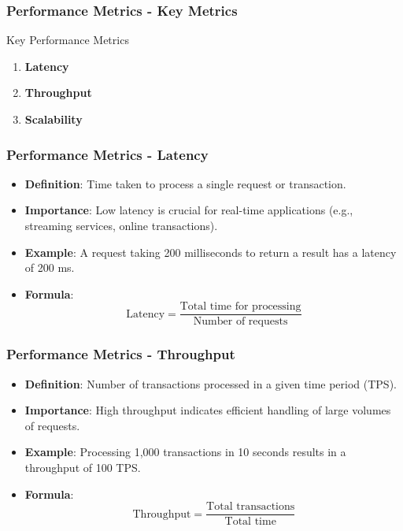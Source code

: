 \documentclass[aspectratio=169]{beamer}
\begin{document}
\begin{frame}[fragile]
    \frametitle{Performance Metrics - Key Metrics}
    \begin{block}{Key Performance Metrics}
        \begin{enumerate}
            \item \textbf{Latency}
            \item \textbf{Throughput}
            \item \textbf{Scalability}
        \end{enumerate}
    \end{block}
\end{frame}

\begin{frame}[fragile]
    \frametitle{Performance Metrics - Latency}
    \begin{itemize}
        \item \textbf{Definition}: Time taken to process a single request or transaction.
        \item \textbf{Importance}: Low latency is crucial for real-time applications (e.g., streaming services, online transactions).
        \item \textbf{Example}: A request taking 200 milliseconds to return a result has a latency of 200 ms.
        \item \textbf{Formula}:
        \begin{equation}
            \text{Latency} = \frac{\text{Total time for processing}}{\text{Number of requests}}
        \end{equation}
    \end{itemize}
\end{frame}

\begin{frame}[fragile]
    \frametitle{Performance Metrics - Throughput}
    \begin{itemize}
        \item \textbf{Definition}: Number of transactions processed in a given time period (TPS).
        \item \textbf{Importance}: High throughput indicates efficient handling of large volumes of requests.
        \item \textbf{Example}: Processing 1,000 transactions in 10 seconds results in a throughput of 100 TPS.
        \item \textbf{Formula}:
        \begin{equation}
            \text{Throughput} = \frac{\text{Total transactions}}{\text{Total time}}
        \end{equation}
    \end{itemize}
\end{frame}
\end{document}
